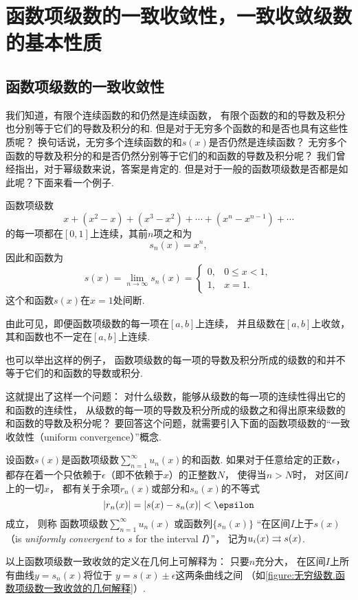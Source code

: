 \section{函数项级数的一致收敛性，一致收敛级数的基本性质}

\subsection{函数项级数的一致收敛性}
我们知道，有限个连续函数的和仍然是连续函数，
有限个函数的和的导数及积分也分别等于它们的导数及积分的和.
但是对于无穷多个函数的和是否也具有这些性质呢？
换句话说，无穷多个连续函数的和\(s(x)\)是否仍然是连续函数？
无穷多个函数的导数及积分的和是否仍然分别等于它们的和函数的导数及积分呢？
我们曾经指出，对于幂级数来说，答案是肯定的.
但是对于一般的函数项级数是否都是如此呢？下面来看一个例子.
\begin{example}
函数项级数\[
x + (x^2-x) + (x^3-x^2) + \dotsb + (x^n-x^{n-1}) + \dotsb
\]的每一项都在\([0,1]\)上连续，其前\(n\)项之和为\[
s_n(x) = x^n,
\]因此和函数为\[
s(x) = \lim\limits_{n\to\infty} s_n(x)
= \left\{ \begin{array}{ll}
0, & 0 \leq x < 1, \\
1, & x = 1.
\end{array} \right.
\]
这个和函数\(s(x)\)在\(x=1\)处间断.
\end{example}

由此可见，即便函数项级数的每一项在\([a,b]\)上连续，
并且级数在\([a,b]\)上收敛，
其和函数也不一定在\([a,b]\)上连续.

也可以举出这样的例子，
函数项级数的每一项的导数及积分所成的级数的和并不等于它们的和函数的导数或积分.

这就提出了这样一个问题：
对什么级数，能够从级数的每一项的连续性得出它的和函数的连续性，
从级数的每一项的导数及积分所成的级数之和得出原来级数的和函数的导数及积分呢？
要回答这个问题，就需要引入下面的函数项级数的“一致收敛性（uniform convergence）”概念.

\begin{definition}\label{definition:无穷级数.函数项级数的一致收敛性}
设函数\(s(x)\)是函数项级数\(\sum\limits_{n=1}^\infty u_n(x)\)的和函数.
如果对于任意给定的正数\(\epsilon\)，
都存在着一个只依赖于\(\epsilon\)（即不依赖于\(x\)）的正整数\(N\)，
使得当\(n>N\)时，
对区间\(I\)上的一切\(x\)，
都有关于余项\(r_n(x)\)或部分和\(s_n(x)\)的不等式\[
\abs{r_n(x)} = \abs{s(x) - s_n(x)} < \epsilon
\]成立，
则称
函数项级数\(\sum\limits_{n=1}^\infty u_n(x)\)
或函数列\(\{s_n(x)\}\)
“在区间\(I\)上于\(s(x)\)%
（is \emph{uniformly convergent} to \(s\) for the interval \(I\)）”，
记为\(u_i(x) \rightrightarrows s(x)\).
\end{definition}
以上函数项级数一致收敛的定义在几何上可解释为：
只要\(n\)充分大，
在区间\(I\)上所有曲线\(y = s_n(x)\)将位于%
\(y = s(x) \pm \epsilon\)这两条曲线之间%
（如\cref{figure:无穷级数.函数项级数一致收敛的几何解释}）.

